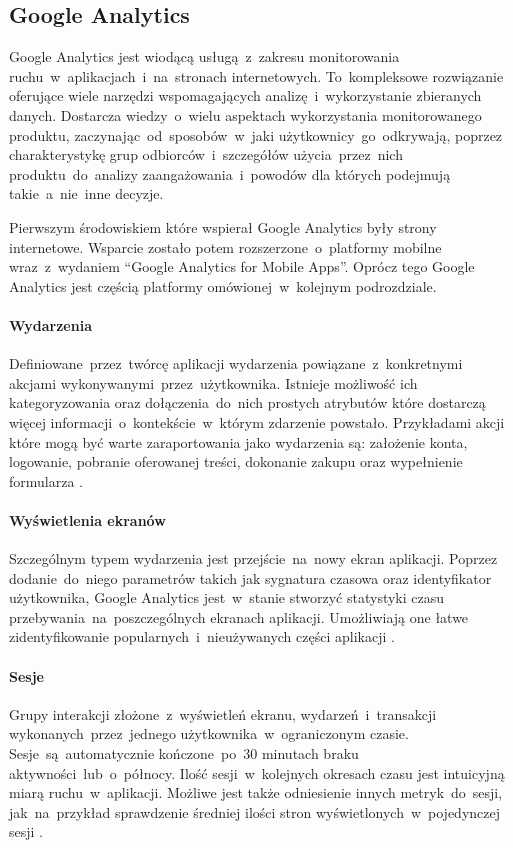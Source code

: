 \subsection{Google Analytics}
\label{sec:ga}
Google Analytics jest wiodącą usługą~z~zakresu monitorowania ruchu~w~aplikacjach~i~na~stronach internetowych. To~kompleksowe rozwiązanie oferujące wiele narzędzi wspomagających analizę~i~wykorzystanie zbieranych danych. Dostarcza wiedzy~o~wielu aspektach wykorzystania monitorowanego produktu, zaczynając~od~sposobów~w~jaki użytkownicy~go~odkrywają, poprzez charakterystykę grup odbiorców~i~szczegółów użycia~przez~nich produktu~do~analizy zaangażowania~i~powodów dla których podejmują takie~a~nie~inne decyzje.

Pierwszym środowiskiem które wspierał Google Analytics były strony internetowe. Wsparcie zostało potem rozszerzone~o~platformy mobilne wraz~z~wydaniem ``Google Analytics for Mobile Apps''. Oprócz tego Google Analytics jest częścią platformy  omówionej~w~kolejnym podrozdziale.

\bigskip
{}

\paragraph{Wydarzenia}
\label{par:ga-events}
Definiowane~przez~twórcę aplikacji wydarzenia powiązane~z~konkretnymi akcjami wykonywanymi~przez~użytkownika. Istnieje możliwość ich kategoryzowania oraz dołączenia~do~nich prostych atrybutów które dostarczą więcej informacji~o~kontekście~w~którym zdarzenie powstało. Przykładami akcji które mogą być warte zaraportowania jako wydarzenia są: założenie konta, logowanie, pobranie oferowanej treści, dokonanie zakupu oraz wypełnienie formularza \cite{GA_Events}.

\paragraph{Wyświetlenia ekranów}
Szczególnym typem wydarzenia jest przejście~na~nowy ekran aplikacji. Poprzez dodanie~do~niego parametrów takich jak sygnatura czasowa oraz identyfikator użytkownika, Google Analytics jest~w~stanie stworzyć statystyki czasu przebywania~na~poszczególnych ekranach aplikacji. Umożliwiają one łatwe zidentyfikowanie popularnych~i~nieużywanych części aplikacji \cite{GA_Pages}.

\paragraph{Sesje}
Grupy interakcji złożone~z~wyświetleń ekranu, wydarzeń~i~transakcji wykonanych~przez~jednego użytkownika~w~ograniczonym czasie. Sesje~są~automatycznie kończone~po~30 minutach braku aktywności~lub~o~północy. Ilość sesji~w~kolejnych okresach czasu jest intuicyjną miarą ruchu~w~aplikacji. Możliwe jest także odniesienie innych metryk~do~sesji, jak~na~przykład sprawdzenie średniej ilości stron wyświetlonych~w~pojedynczej sesji \cite{GA_Sessions}.

